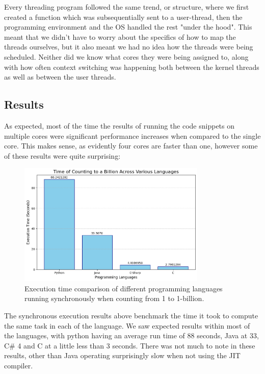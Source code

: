 \documentclass[12pt,a4paper]{article}
\begin{document}
Every threading program followed the same trend, or structure, where we first created a function which was subsequentially sent to a user-thread, then the programming environment and the OS handled the rest "under the hood". This meant that we didn't have to worry about the specifics of how to map the threads ourselves, but it also meant we had no idea how the threads were being scheduled. Neither did we know what cores they were being assigned to, along with how often context switching was happening both between the kernel threads as well as between the user threads. 

\newpage
\subsection{Results}

As expected, most of the time the results of running the code snippets on multiple cores were significant performance increases when compared to the single core. This makes sense, as evidently four cores are faster than one, however some of these results were quite surprising:

\begin{figure}[!htb]
    \centering
    \includegraphics[width=0.8\textwidth]{../sync_records/sync_exec_times.png}
    \captionsetup{font=tiny, justification=centering}
    \caption{Execution time comparison of different programming languages running synchronously when counting from 1 to 1-billion.}
    \label{fig:sync-exec-times}
\end{figure}

The synchronous execution results above benchmark the time it took to compute the same task in each of the language. We saw expected results within most of the languages, with python having an average run time of 88 seconds, Java at 33, C\# 4 and C at a little less than 3 seconds. There was not much to note in these results, other than Java operating surprisingly slow when not using the JIT compiler.
\end{document}
